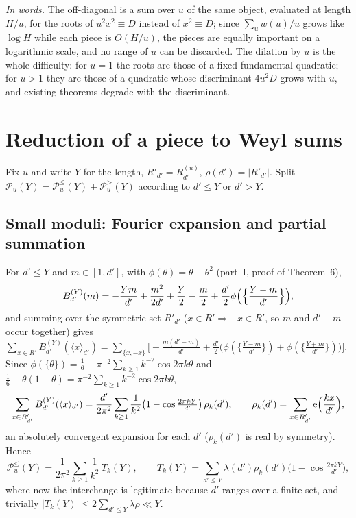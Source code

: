 \documentclass[11pt,a4paper]{article}
\theoremstyle{remark}\newtheorem{remark}[theorem]{Remark}
\newcommand{\rep}[2]{\langle #1\rangle_{#2}}
\begin{document}
\emph{In words.} The off-diagonal is a sum over $u$ of the same object, evaluated at length $H/u$, for the
roots of $u^2x^2\equiv D$ instead of $x^2\equiv D$; since $\sum_uw(u)/u$ grows like $\log H$ while each piece
is $O(H/u)$, the pieces are equally important on a logarithmic scale, and no range of $u$ can be discarded.
The dilation by $\bar u$ is the whole difficulty: for $u=1$ the roots are those of a fixed fundamental
quadratic; for $u>1$ they are those of a quadratic whose discriminant $4u^2D$ grows with $u$, and existing
theorems degrade with the discriminant.

\section{Reduction of a piece to Weyl sums}\label{sec:reduction}

Fix $u$ and write $Y$ for the length, $R'_{d'}=R^{(u)}_{d'}$, $\rho(d')=|R'_{d'}|$. Split $\mathcal P_u(Y)=\mathcal P^{\le}_u(Y)+\mathcal P^{>}_u(Y)$
according to $d'\le Y$ or $d'>Y$.

\subsection{Small moduli: Fourier expansion and partial summation}

For $d'\le Y$ and $m\in[1,d']$, with $\phi(\theta)=\theta-\theta^2$ (part~I, proof of Theorem~6),
\[
B^{(Y)}_{d'}(m)=-\frac{Ym}{d'}+\frac{m^2}{2d'}+\frac Y2-\frac m2+\frac{d'}2\phi\Bigl(\Bigl\{\frac{Y-m}{d'}\Bigr\}\Bigr),
\]
and summing over the symmetric set $R'_{d'}$ ($x\in R'\Rightarrow-x\in R'$, so $m$ and $d'-m$ occur together) gives
$\sum_{x\in R'}B^{(Y)}_{d'}(\rep x{d'})=\sum_{\{x,-x\}}\bigl[-\tfrac{m(d'-m)}{d'}+\tfrac{d'}2\bigl(\phi(\{\tfrac{Y-m}{d'}\})+\phi(\{\tfrac{Y+m}{d'}\})\bigr)\bigr]$.
Since $\phi(\{\theta\})=\tfrac16-\pi^{-2}\sum_{k\ge1}k^{-2}\cos2\pi k\theta$ and $\tfrac16-\theta(1-\theta)=\pi^{-2}\sum_{k\ge1}k^{-2}\cos2\pi k\theta$,
\begin{equation}\label{eq:fourier}
\sum_{x\in R'_{d'}}B^{(Y)}_{d'}(\rep x{d'})=\frac{d'}{2\pi^2}\sum_{k\ge1}\frac{1}{k^2}\bigl(1-\cos\tfrac{2\pi kY}{d'}\bigr)\,\rho_k(d'),\qquad
\rho_k(d')=\sum_{x\in R'_{d'}}\e\Bigl(\frac{kx}{d'}\Bigr),
\end{equation}
an absolutely convergent expansion for each $d'$ ($\rho_k(d')$ is real by symmetry). Hence
\begin{equation}\label{eq:Ple}
\mathcal P^\le_u(Y)=\frac1{2\pi^2}\sum_{k\ge1}\frac1{k^2}\,T_k(Y),\qquad T_k(Y)=\sum_{d'\le Y}\lambda(d')\rho_k(d')\bigl(1-\cos\tfrac{2\pi kY}{d'}\bigr),
\end{equation}
where now the interchange is legitimate because $d'$ ranges over a finite set, and trivially $|T_k(Y)|\le2\sum_{d'\le Y}\lambda\rho\ll Y$.
\end{document}
